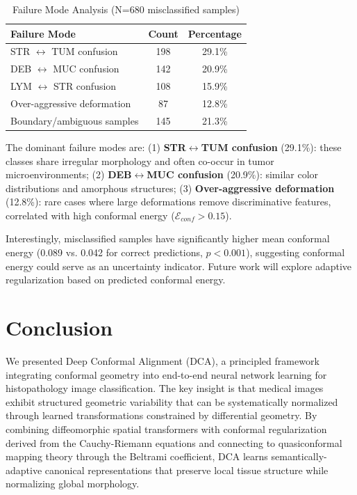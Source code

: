 \documentclass[10pt,journal,compsoc]{IEEEtran}
\begin{document}
\begin{table}[t]
\centering
\caption{Failure Mode Analysis (N=680 misclassified samples)}
\label{tab:failure}
\begin{tabular}{lcc}
\hline
\textbf{Failure Mode} & \textbf{Count} & \textbf{Percentage} \\
\hline
STR $\leftrightarrow$ TUM confusion & 198 & 29.1\% \\
DEB $\leftrightarrow$ MUC confusion & 142 & 20.9\% \\
LYM $\leftrightarrow$ STR confusion & 108 & 15.9\% \\
Over-aggressive deformation & 87 & 12.8\% \\
Boundary/ambiguous samples & 145 & 21.3\% \\
\hline
\end{tabular}
\end{table}

The dominant failure modes are: (1) \textbf{STR$\leftrightarrow$TUM confusion} (29.1\%): these classes share irregular morphology and often co-occur in tumor microenvironments; (2) \textbf{DEB$\leftrightarrow$MUC confusion} (20.9\%): similar color distributions and amorphous structures; (3) \textbf{Over-aggressive deformation} (12.8\%): rare cases where large deformations remove discriminative features, correlated with high conformal energy ($\mathcal{E}_{conf} > 0.15$).

Interestingly, misclassified samples have significantly higher mean conformal energy (0.089 vs. 0.042 for correct predictions, $p < 0.001$), suggesting conformal energy could serve as an uncertainty indicator. Future work will explore adaptive regularization based on predicted conformal energy.

\section{Conclusion}
\label{sec:conclusion}

We presented Deep Conformal Alignment (DCA), a principled framework integrating conformal geometry into end-to-end neural network learning for histopathology image classification. The key insight is that medical images exhibit structured geometric variability that can be systematically normalized through learned transformations constrained by differential geometry. By combining diffeomorphic spatial transformers with conformal regularization derived from the Cauchy-Riemann equations and connecting to quasiconformal mapping theory through the Beltrami coefficient, DCA learns semantically-adaptive canonical representations that preserve local tissue structure while normalizing global morphology.
\end{document}
